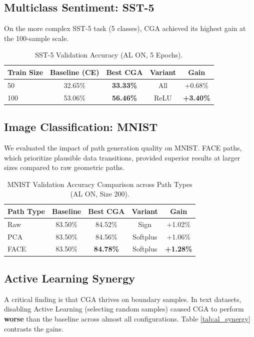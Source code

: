 \documentclass[sigconf,anonymous]{aamas}
\begin{document}
\subsection{Multiclass Sentiment: SST-5}
On the more complex SST-5 task (5 classes), CGA achieved its highest gain at the 100-sample scale.

\begin{table}[h]
\centering
\caption{SST-5 Validation Accuracy (AL ON, 5 Epochs).}
\label{tab:sst5_results}
\begin{tabular}{@{}lcccc@{}}
\toprule
\textbf{Train Size} & \textbf{Baseline (CE)} & \textbf{Best CGA} & \textbf{Variant} & \textbf{Gain} \\ \midrule
50 & 32.65\% & \textbf{33.33\%} & All & +0.68\% \\
100 & 53.06\% & \textbf{56.46\%} & ReLU & \textbf{+3.40\%} \\ \bottomrule
\end{tabular}
\end{table}

\subsection{Image Classification: MNIST}
We evaluated the impact of path generation quality on MNIST. FACE paths, which prioritize plausible data transitions, provided superior results at larger sizes compared to raw geometric paths.

\begin{table}[h]
\centering
\caption{MNIST Validation Accuracy Comparison across Path Types (AL ON, Size 200).}
\label{tab:mnist_paths}
\begin{tabular}{@{}lcccc@{}}
\toprule
\textbf{Path Type} & \textbf{Baseline} & \textbf{Best CGA} & \textbf{Variant} & \textbf{Gain} \\ \midrule
Raw & 83.50\% & 84.52\% & Sign & +1.02\% \\
PCA & 83.50\% & 84.56\% & Softplus & +1.06\% \\
FACE & 83.50\% & \textbf{84.78\%} & Softplus & \textbf{+1.28\%} \\ \bottomrule
\end{tabular}
\end{table}

\subsection{Active Learning Synergy}
A critical finding is that CGA thrives on boundary samples. In text datasets, disabling Active Learning (selecting random samples) caused CGA to perform \textbf{worse} than the baseline across almost all configurations. Table \ref{tab:al_synergy} contrasts the gains.
\end{document}
